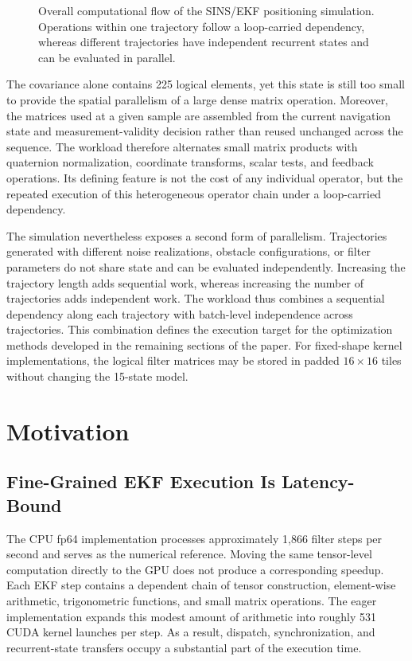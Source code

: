 \documentclass[research]{fcs}
\begin{document}
\begin{figure}[!t]
  \caption{Overall computational flow of the SINS/EKF positioning simulation. Operations within one trajectory follow a loop-carried dependency, whereas different trajectories have independent recurrent states and can be evaluated in parallel.}
  \label{fig:computational-flow}
\end{figure}

The covariance alone contains 225 logical elements, yet this state is still too small to provide the spatial parallelism of a large dense matrix operation. Moreover, the matrices used at a given sample are assembled from the current navigation state and measurement-validity decision rather than reused unchanged across the sequence. The workload therefore alternates small matrix products with quaternion normalization, coordinate transforms, scalar tests, and feedback operations. Its defining feature is not the cost of any individual operator, but the repeated execution of this heterogeneous operator chain under a loop-carried dependency.

The simulation nevertheless exposes a second form of parallelism. Trajectories generated with different noise realizations, obstacle configurations, or filter parameters do not share state and can be evaluated independently. Increasing the trajectory length adds sequential work, whereas increasing the number of trajectories adds independent work. The workload thus combines a sequential dependency along each trajectory with batch-level independence across trajectories. This combination defines the execution target for the optimization methods developed in the remaining sections of the paper. For fixed-shape kernel implementations, the logical filter matrices may be stored in padded $16\times16$ tiles without changing the 15-state model.

\section{Motivation}
\label{sec:motivation}

\subsection{Fine-Grained EKF Execution Is Latency-Bound}
\label{subsec:motivation-latency}

The CPU fp64 implementation processes approximately 1,866 filter steps per second and serves as the numerical reference. Moving the same tensor-level computation directly to the GPU does not produce a corresponding speedup. Each EKF step contains a dependent chain of tensor construction, element-wise arithmetic, trigonometric functions, and small matrix operations. The eager implementation expands this modest amount of arithmetic into roughly 531 CUDA kernel launches per step. As a result, dispatch, synchronization, and recurrent-state transfers occupy a substantial part of the execution time.
\end{document}
